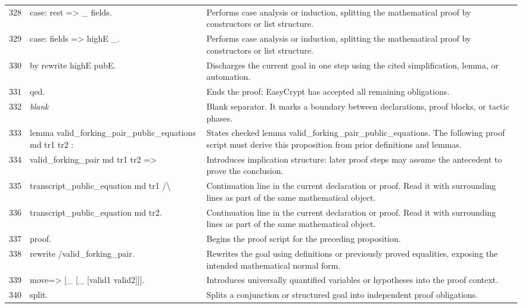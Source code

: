 \documentclass[10pt]{article}
\begin{document}
\begin{longtable}{r L{0.53\textwidth} L{0.37\textwidth}}
328 & {\ttfamily\scriptsize case: rest => \_ fields.} & Performs case analysis or induction, splitting the mathematical proof by constructors or list structure. \\
329 & {\ttfamily\scriptsize case: fields => highE \_.} & Performs case analysis or induction, splitting the mathematical proof by constructors or list structure. \\
330 & {\ttfamily\scriptsize by rewrite highE pubE.} & Discharges the current goal in one step using the cited simplification, lemma, or automation. \\
331 & {\ttfamily\scriptsize qed.} & Ends the proof; EasyCrypt has accepted all remaining obligations. \\
332 & {\ttfamily\scriptsize \emph{blank}} & Blank separator.  It marks a boundary between declarations, proof blocks, or tactic phases. \\
333 & {\ttfamily\scriptsize lemma valid\_forking\_pair\_public\_equations md tr1 tr2 :} & States checked lemma valid\_forking\_pair\_public\_equations.  The following proof script must derive this proposition from prior definitions and lemmas. \\
334 & {\ttfamily\scriptsize   valid\_forking\_pair md tr1 tr2 =>} & Introduces implication structure: later proof steps may assume the antecedent to prove the conclusion. \\
335 & {\ttfamily\scriptsize   transcript\_public\_equation md tr1 /\textbackslash{}} & Continuation line in the current declaration or proof.  Read it with surrounding lines as part of the same mathematical object. \\
336 & {\ttfamily\scriptsize   transcript\_public\_equation md tr2.} & Continuation line in the current declaration or proof.  Read it with surrounding lines as part of the same mathematical object. \\
337 & {\ttfamily\scriptsize proof.} & Begins the proof script for the preceding proposition. \\
338 & {\ttfamily\scriptsize rewrite /valid\_forking\_pair.} & Rewrites the goal using definitions or previously proved equalities, exposing the intended mathematical normal form. \\
339 & {\ttfamily\scriptsize move=> [\_ [\_ [valid1 valid2]]].} & Introduces universally quantified variables or hypotheses into the proof context. \\
340 & {\ttfamily\scriptsize split.} & Splits a conjunction or structured goal into independent proof obligations. \\

\end{longtable}
\end{document}
